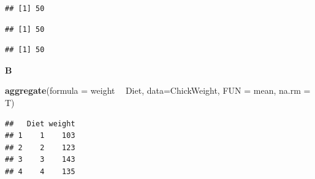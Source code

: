 \documentclass[]{book}
\newenvironment{Shaded}{\begin{snugshade}}{\end{snugshade}}
\newcommand{\CommentTok}[1]{\textcolor[rgb]{0.56,0.35,0.01}{\textit{#1}}}
\newcommand{\ControlFlowTok}[1]{\textcolor[rgb]{0.13,0.29,0.53}{\textbf{#1}}}
\newcommand{\DataTypeTok}[1]{\textcolor[rgb]{0.13,0.29,0.53}{#1}}
\newcommand{\KeywordTok}[1]{\textcolor[rgb]{0.13,0.29,0.53}{\textbf{#1}}}
\newcommand{\NormalTok}[1]{#1}
\newcommand{\OperatorTok}[1]{\textcolor[rgb]{0.81,0.36,0.00}{\textbf{#1}}}
\newcommand{\StringTok}[1]{\textcolor[rgb]{0.31,0.60,0.02}{#1}}
\begin{document}
\begin{verbatim}
## [1] 50
\end{verbatim}

\begin{Shaded}
\end{Shaded}

\begin{verbatim}
## [1] 50
\end{verbatim}

\begin{Shaded}
\end{Shaded}

\begin{verbatim}
## [1] 50
\end{verbatim}

\textbf{B}

\begin{Shaded}
\begin{Highlighting}[]
\KeywordTok{aggregate}\NormalTok{(}\DataTypeTok{formula =}\NormalTok{ weight }\OperatorTok{~}\StringTok{ }\NormalTok{Diet, }\DataTypeTok{data=}\NormalTok{ChickWeight, }\DataTypeTok{FUN =}\NormalTok{ mean, }\DataTypeTok{na.rm =}\NormalTok{ T)}
\end{Highlighting}
\end{Shaded}

\begin{verbatim}
##   Diet weight
## 1    1    103
## 2    2    123
## 3    3    143
## 4    4    135
\end{verbatim}

\begin{Shaded}
\end{Shaded}
\end{document}
